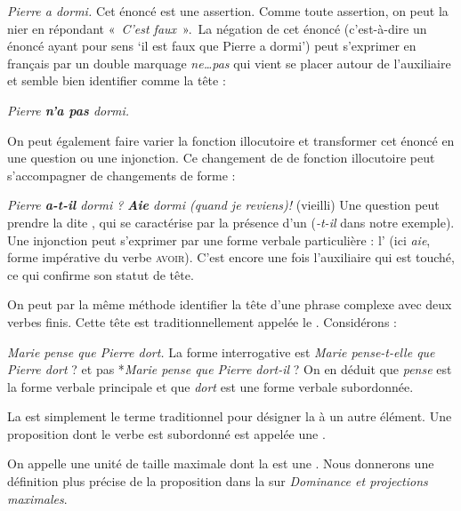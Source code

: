 \ea
\textit{{Pierre a dormi}.}
\z
Cet énoncé est une assertion. Comme toute assertion, on peut la nier en répondant «~\textit{C’est faux}~».~La négation de cet énoncé (c'est-à-dire un énoncé ayant pour sens ‘il est faux que Pierre a dormi’) peut s’exprimer en français par un double marquage \textit{ne…pas} qui vient se placer autour de l'auxiliaire et semble bien identifier comme la tête :

\ea
\textit{{Pierre} \textbf{{n’a}  {pas}}  {dormi.}}
\z

On peut également faire varier la fonction illocutoire et transformer cet énoncé en une question ou une injonction. Ce changement de de fonction illocutoire peut s'accompagner de changements de forme :

\ea
  \ea \textit{Pierre \textbf{a-t-il} dormi ?}
  \ex \textit{\textbf{Aie}  dormi (quand  je reviens)!} (vieilli)
  \z
\z
Une question peut prendre la  dite , qui se caractérise par la présence d’un  (\textit{{}-t-il} dans notre exemple). Une injonction peut s’exprimer par une forme verbale particulière : l’ (ici \textit{aie}, forme impérative du verbe \textsc{avoir}). C’est encore une fois l’auxiliaire qui est touché, ce qui confirme son statut de tête.

On peut par la même méthode identifier la tête d’une phrase complexe avec deux verbes finis. Cette tête est traditionnellement appelée le . Considérons :

\ea
\textit{{Marie pense que Pierre dort}.}
\z
La forme interrogative est \textit{Marie pense-t-elle que Pierre dort} ? et pas *\textit{Marie pense que Pierre dort-il} ? On en déduit que \textit{pense} est la forme verbale principale et que \textit{dort} est une forme verbale subordonnée.

{La  est simplement le terme traditionnel pour désigner la  à un autre élément.  Une proposition dont le verbe est subordonné est appelée une .}

On appelle  une unité de taille maximale dont la  est une . Nous donnerons une définition plus précise de la proposition dans la  sur \textit{Dominance et projections maximales}.

